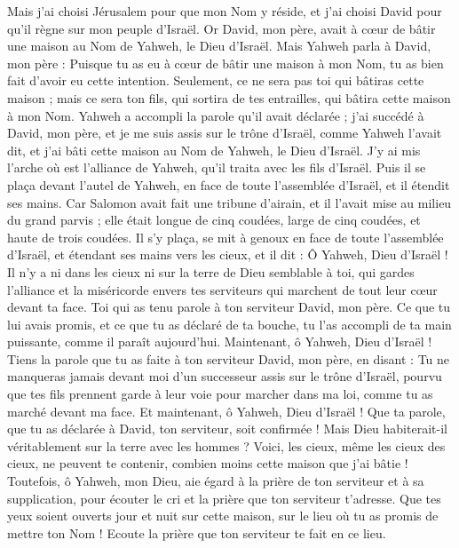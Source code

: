\begin{multicols}{2}
Mais j'ai choisi Jérusalem pour que mon Nom y réside, et j'ai choisi David pour qu'il règne sur mon peuple d'Israël.
Or David, mon père, avait à cœur de bâtir une maison au Nom de Yahweh, le Dieu d'Israël.
Mais Yahweh parla à David, mon père : Puisque tu as eu à cœur de bâtir une maison à mon Nom, tu as bien fait d’avoir eu cette intention.
Seulement, ce ne sera pas toi qui bâtiras cette maison ; mais ce sera ton fils, qui sortira de tes entrailles, qui bâtira cette maison à mon Nom.
Yahweh a accompli la parole qu'il avait déclarée ; j'ai succédé à David, mon père, et je me suis assis sur le trône d'Israël, comme Yahweh l'avait dit, et j'ai bâti cette maison au Nom de Yahweh, le Dieu d'Israël.
J'y ai mis l'arche où est l'alliance de Yahweh, qu'il traita avec les fils d’Israël.
Puis il se plaça devant l'autel de Yahweh, en face de toute l'assemblée d'Israël, et il étendit ses mains.
Car Salomon avait fait une tribune d'airain, et il l'avait mise au milieu du grand parvis ; elle était longue de cinq coudées, large de cinq coudées, et haute de trois coudées. Il s'y plaça, se mit à genoux en face de toute l'assemblée d'Israël, et étendant ses mains vers les cieux, et il dit :
Ô Yahweh, Dieu d'Israël ! Il n'y a ni dans les cieux ni sur la terre de Dieu semblable à toi, qui gardes l'alliance et la miséricorde envers tes serviteurs qui marchent de tout leur cœur devant ta face.
Toi qui as tenu parole à ton serviteur David, mon père. Ce que tu lui avais promis, et ce que tu as déclaré de ta bouche, tu l'as accompli de ta main puissante, comme il paraît aujourd'hui.
Maintenant, ô Yahweh, Dieu d'Israël ! Tiens la parole que tu as faite à ton serviteur David, mon père, en disant : Tu ne manqueras jamais devant moi d'un successeur assis sur le trône d'Israël, pourvu que tes fils prennent garde à leur voie pour marcher dans ma loi, comme tu as marché devant ma face.
Et maintenant, ô Yahweh, Dieu d'Israël !  Que ta parole, que tu as déclarée à David, ton serviteur, soit confirmée !
Mais Dieu habiterait-il véritablement sur la terre avec les hommes ? Voici, les cieux, même les cieux des cieux, ne peuvent te contenir, combien moins cette maison que j'ai bâtie !
Toutefois, ô Yahweh, mon Dieu, aie égard à la prière de ton serviteur et à sa supplication, pour écouter le cri et la prière que ton serviteur t'adresse.
Que tes yeux soient ouverts jour et nuit sur cette maison, sur le lieu où tu as promis de mettre ton Nom ! Ecoute la prière que ton serviteur te fait en ce lieu.

\end{multicols}
